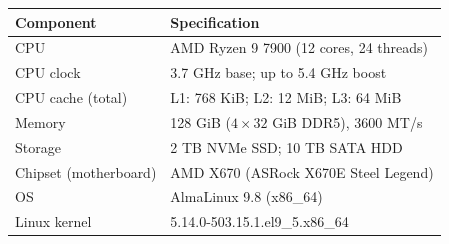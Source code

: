\small
  \renewcommand{\arraystretch}{1.15}
  \begin{tabular}{@{}ll@{}}
    \toprule
    Component & Specification \\
    \midrule
    CPU & AMD Ryzen 9 7900 (12 cores, 24 threads) \\
    CPU clock & 3.7 GHz base; up to 5.4 GHz boost \\
    CPU cache (total) & L1: 768 KiB; L2: 12 MiB; L3: 64 MiB \\
    Memory & 128 GiB ($4 \times 32$ GiB DDR5), 3600 MT/s \\
    Storage & 2 TB NVMe SSD; 10 TB SATA HDD \\
    Chipset (motherboard) & AMD X670 (ASRock X670E Steel Legend) \\
    OS & AlmaLinux 9.8 (x86\_64) \\
    Linux kernel & 5.14.0-503.15.1.el9\_5.x86\_64 \\
    \bottomrule
  \end{tabular}
